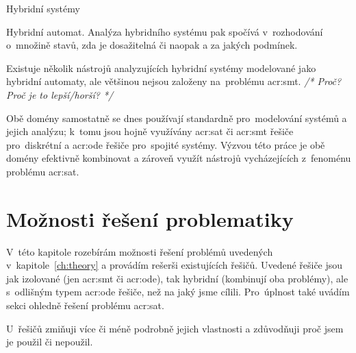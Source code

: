 \documentclass[thesis=M,czech]{FITthesis}[2012/06/26]
\newcommand{\acrlabel}[1]{acr:#1}
\newcommand{\acr}[1]{\acrshort{\acrlabel{#1}}}
\newcommand{\cmt}[1]{\textit{/* #1 */}}
\newcommand{\rf}[1]{\ref{#1}}
\begin{document}
\begin{section}{Hybridní systémy}
\begin{paragraph}{Hybridní automat.}
Analýza hybridního systému pak spočívá
v~rozhodování o~množině stavů,
zda je dosažitelná či naopak
a za jakých podmínek.

Existuje několik nástrojů
analyzujících hybridní systémy
modelované jako hybridní automaty,
ale většinou nejsou založeny
na~problému \acr{smt}.
\cmt{Proč? Proč je to lepší/horší?}
\end{paragraph} %


\bigskip

Obě domény samostatně se dnes
používají standardně pro~modelování systémů
a jejich analýzu;
k~tomu jsou hojně využívány
\acr{sat} či \acr{smt} řešiče pro~diskrétní
a \acr{ode} řešiče pro~spojité systémy.
Výzvou této práce je obě domény efektivně kombinovat
a zároveň využít nástrojů
vycházejících z~fenoménu problému \acr{sat}.
\end{section} %



\chapter{Možnosti řešení problematiky}\label{ch:search}
V~této kapitole rozebírám možnosti řešení problémů
uvedených v~kapitole~\rf{ch:theory}
a provádím rešerši existujících řešičů.
Uvedené řešiče jsou jak izolované (jen \acr{smt} či \acr{ode}),
tak hybridní (kombinují oba problémy),
ale s~odlišným typem \acr{ode} řešiče, než na jaký jsme cílili.
Pro~úplnost také uvádím sekci ohledně řešení problému \acr{sat}.

U~řešičů zmiňuji více či méně podrobně
jejich vlastnosti a zdůvodňuji proč jsem je použil či nepoužil.

\end{document}
